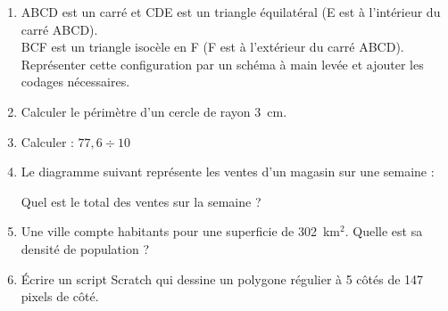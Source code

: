 \documentclass[a4paper,11pt]{article}
\newcommand{\np}[1]{\numprint{#1}}
\newcommand{\exercice}[2]{%
  \newpage
  \noindent{\Large\bfseries Exercice #1\hspace{0.3em}{\normalfont\normalsize(#2 points)}}%
  \par\vspace{0.6cm}%
}
\begin{document}
\begin{enumerate}[label=\textbf{\arabic*)}, leftmargin=1.2cm, itemsep=0.5cm]

\item ABCD est un carré et CDE est un triangle équilatéral (E est à l'intérieur du carré ABCD).\\
BCF est un triangle isocèle en F (F est à l'extérieur du carré ABCD).\\
Représenter cette configuration par un schéma à main levée et ajouter les codages nécessaires.

\item Calculer le périmètre d'un cercle de rayon 3~cm.

\item Calculer : $77{,}6 \div 10$

\item Le diagramme suivant représente les ventes d'un magasin sur une semaine :

\begin{center}
\end{center}

Quel est le total des ventes sur la semaine ?

\item Une ville compte \np{49298} habitants pour une superficie de 302~km$^2$. Quelle est sa densité de population ?

\item Écrire un script Scratch qui dessine un polygone régulier à 5 côtés de 147 pixels de côté.

\end{enumerate}

\exercice{2}{4}
\end{document}
